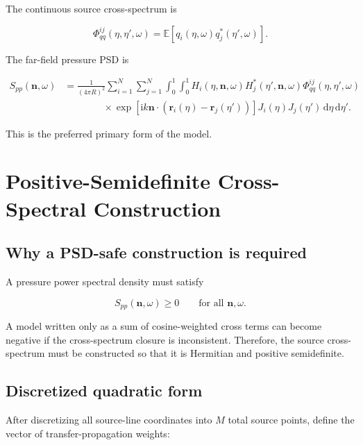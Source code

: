 \documentclass[11pt]{article}
\newcommand{\dd}{\,\mathrm{d}}
\newcommand{\ii}{\mathrm{i}}
\newcommand{\vect}[1]{\bm{#1}}
\newcommand{\E}{\mathbb{E}}
\begin{document}
The continuous source cross-spectrum is

\begin{equation}
    \Phi_{qq}^{ij}(\eta,\eta',\omega)
    =
    \E
    \left[
        q_i(\eta,\omega)
        q_j^{*}(\eta',\omega)
    \right].
\end{equation}

The far-field pressure PSD is

\begin{align}
    S_{pp}(\vect{n},\omega)
    &=
    \frac{1}{(4\pi R)^2}
    \sum_{i=1}^{N}
    \sum_{j=1}^{N}
    \int_{0}^{1}
    \int_{0}^{1}
    H_i(\eta,\vect{n},\omega)
    H_j^{*}(\eta',\vect{n},\omega)
    \Phi_{qq}^{ij}(\eta,\eta',\omega)
    \nonumber \\
    &\qquad\qquad \times
    \exp
    \left[
        \ii k \vect{n}\cdot
        \left(
            \vect{r}_i(\eta)-\vect{r}_j(\eta')
        \right)
    \right]
    J_i(\eta)J_j(\eta')
    \dd\eta \dd\eta'.
\end{align}

This is the preferred primary form of the model.

\section{Positive-Semidefinite Cross-Spectral Construction}

\subsection{Why a PSD-safe construction is required}

A pressure power spectral density must satisfy

\begin{equation}
    S_{pp}(\vect{n},\omega) \geq 0
    \qquad
    \text{for all } \vect{n}, \omega.
\end{equation}

A model written only as a sum of cosine-weighted cross terms can become negative if the cross-spectrum closure is inconsistent. Therefore, the source cross-spectrum must be constructed so that it is Hermitian and positive semidefinite.

\subsection{Discretized quadratic form}

After discretizing all source-line coordinates into $M$ total source points, define the vector of transfer-propagation weights:
\end{document}
